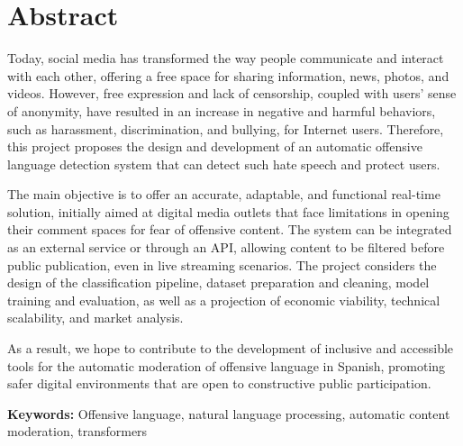 \chapter*{Abstract}

Today, social media has transformed the way people communicate and interact with each other, offering a free space for sharing information, news, photos, and videos. However, free expression and lack of censorship, coupled with users' sense of anonymity, have resulted in an increase in negative and harmful behaviors, such as harassment, discrimination, and bullying, for Internet users. Therefore, this project proposes the design and development of an automatic offensive language detection system that can detect such hate speech and protect users.

The main objective is to offer an accurate, adaptable, and functional real-time solution, initially aimed at digital media outlets that face limitations in opening their comment spaces for fear of offensive content. The system can be integrated as an external service or through an API, allowing content to be filtered before public publication, even in live streaming scenarios. The project considers the design of the classification pipeline, dataset preparation and cleaning, model training and evaluation, as well as a projection of economic viability, technical scalability, and market analysis.

As a result, we hope to contribute to the development of inclusive and accessible tools for the automatic moderation of offensive language in Spanish, promoting safer digital environments that are open to constructive public participation.

\noindent\textbf{Keywords:} Offensive language, natural language processing, automatic content moderation, transformers
